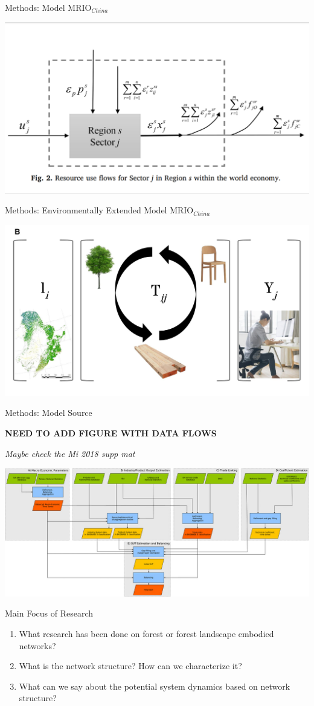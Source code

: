 \begin{frame}{Methods: Model MRIO\(_{China}\)}

\begin{center}\includegraphics[width=0.5\linewidth]{images/Wu_2018_Fig2} \end{center}

\end{frame}

\begin{frame}{Methods: Environmentally Extended Model MRIO\(_{China}\)}

\begin{center}\includegraphics[width=0.5\linewidth]{images/china_eemrio} \end{center}

\end{frame}

\begin{frame}{Methods: Model Source}

\textbf{NEED TO ADD FIGURE WITH DATA FLOWS}

\emph{Maybe check the Mi 2018 supp mat}

\begin{center}\includegraphics[width=0.5\linewidth]{images/exiobase3} \end{center}

\end{frame}

\begin{frame}{Main Focus of Research}

\begin{enumerate}
\item
  What research has been done on forest or forest landscape embodied
  networks?
\item
  What is the network structure? How can we characterize it?
\item
  What can we say about the potential system dynamics based on network
  structure?
\end{enumerate}

\end{frame}

